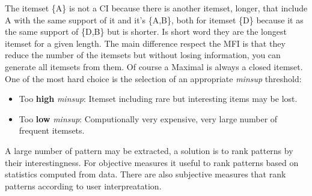 \documentclass[12pt]{article}
\begin{document}
The itemset \{A\} is not a CI because there is another itemset, longer, that include A with the same support of it and it's \{A,B\}, both for itemset \{D\} because it as the same support of \{D,B\} but is shorter. Is short word they are the longest itemset for a given length. The main difference respect the MFI is that they reduce the number of the itemsets but without losing information, you can generate all itemsets from them. Of course a Maximal is always a closed itemset.\\

One of the most hard choice is the selection of an appropriate \textit{minsup} threshold:
\begin{itemize}
  \item Too \textbf{high} \textit{minsup}: Itemset including rare but interesting items may be lost.
  \item Too \textbf{low} \textit{minsup}: Computionally very expensive, very large number of frequent itemsets.
\end{itemize}

A large number of pattern may be extracted, a solution is to rank patterns by their interestingness. For objective measures it useful to rank patterns based on statistics computed from data. There are also subjective measures that rank patterns according to user interpreatation.
\end{document}
